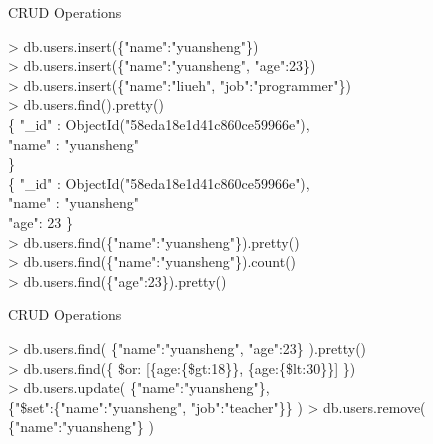 \documentclass{beamer}
\begin{document}
\begin{frame}{CRUD Operations}
    \begin{minipage}[t]{0.7\textwidth}
        \scriptsize
        \begin{Alms*}
            > db.users.insert(\{"name":"yuansheng"\}) \\
            > db.users.insert(\NI\{"name":"yuansheng", "age":23\}\ND) \\
            > db.users.insert(\NI\{"name":"liueh", "job":"programmer"\}\ND) \\
            > db.users.find().pretty() \\
            \{ \NI
                "\_id" : ObjectId("58eda18e1d41c860ce59966e"), \\
                "name" : "yuansheng" \\
            \ND \} \\
            \{ \NI
                "\_id" : ObjectId("58eda18e1d41c860ce59966e"), \\
                "name" : "yuansheng" \\
                "age": 23
            \ND \} \\
            > db.users.find(\{"name":"yuansheng"\}).pretty() \\
            > db.users.find(\{"name":"yuansheng"\}).count() \\
            > db.users.find(\{"age":23\}).pretty() \\
        \end{Alms*}
    \end{minipage}
\end{frame}

\begin{frame}{CRUD Operations}
	\begin{minipage}[t]{0.45\textwidth}
		\scriptsize
		\begin{Alms*}
			> db.users.find(\NI
			\{"name":"yuansheng", "age":23\}
			\ND).pretty() \\
			> db.users.find(\{ \NI\$or: [\{age:\{\$gt:18\}\}, \{age:\{\$lt:30\}\}] \ND\})\\
			> db.users.update(\NI
			\{"name":"yuansheng"\},\\
			\{"\$set":\{"name":"yuansheng", "job":"teacher"\}\}
			\ND)
			> db.users.remove(\NI
			\{"name":"yuansheng"\}
			\ND )
		\end{Alms*}
	\end{minipage}
\end{frame}
\end{document}
